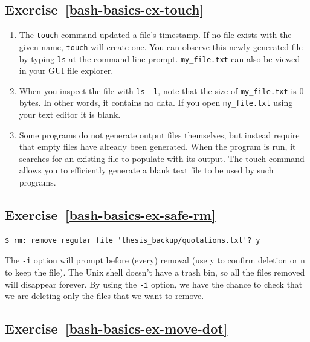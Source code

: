 \documentclass[
]{krantz}
\begin{document}
\hypertarget{exercise-refbash-basics-ex-touch}{%
\subsection*{Exercise~\ref{bash-basics-ex-touch}}\label{exercise-refbash-basics-ex-touch}}


\begin{enumerate}
\def\labelenumi{\arabic{enumi}.}
\item
  The \texttt{touch} command updated a file's timestamp.
  If no file exists with the given name, \texttt{touch} will create one.
  You can observe this newly generated file by typing \texttt{ls} at the
  command line prompt. \texttt{my\_file.txt} can also be viewed in your
  GUI file explorer.
\item
  When you inspect the file with \texttt{ls\ -l}, note that the size of
  \texttt{my\_file.txt} is 0 bytes. In other words, it contains no data.
  If you open \texttt{my\_file.txt} using your text editor it is blank.
\item
  Some programs do not generate output files themselves, but
  instead require that empty files have already been generated.
  When the program is run, it searches for an existing file to
  populate with its output. The touch command allows you to
  efficiently generate a blank text file to be used by such
  programs.
\end{enumerate}

\hypertarget{exercise-refbash-basics-ex-safe-rm}{%
\subsection*{Exercise~\ref{bash-basics-ex-safe-rm}}\label{exercise-refbash-basics-ex-safe-rm}}


\begin{verbatim}
$ rm: remove regular file 'thesis_backup/quotations.txt'? y
\end{verbatim}

The \texttt{-i} option will prompt before (every) removal
(use y to confirm deletion or n to keep the file).
The Unix shell doesn't have a trash bin, so all the files removed will disappear forever.
By using the \texttt{-i} option, we have the chance to check that we are deleting
only the files that we want to remove.

\hypertarget{exercise-refbash-basics-ex-move-dot}{%
\subsection*{Exercise~\ref{bash-basics-ex-move-dot}}\label{exercise-refbash-basics-ex-move-dot}}
\end{document}
